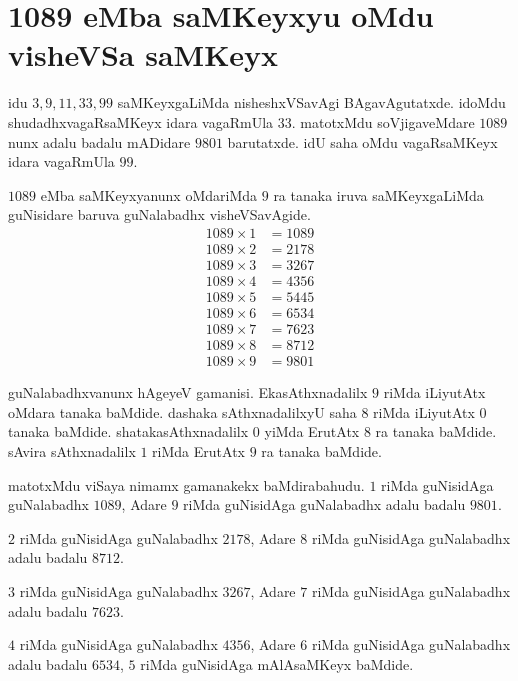 \vspace{-.5cm}
\section*{{\rm 1089} eMba saMKeyxyu oMdu visheVSa saMKeyx}

idu $3,9,11,33,99$ saMKeyxgaLiMda nisheshxVSavAgi BAgavAgutatxde. idoMdu shudadhx\-vagaRsaMKeyx idara vagaRmUla $33$. matotxMdu soVjigaveMdare $1089$ nunx adalu badalu mADidare $9801$ barutatxde. idU saha oMdu vagaRsaMKeyx idara vagaRmUla $99$.

$1089$ eMba saMKeyxyanunx oMdariMda $9$ ra tanaka iruva saMKeyxgaLiMda guNisidare baruva guNalabadhx visheVSavAgide.
\begin{align*}
1089\times 1 &= 1089\\
1089\times 2 &= 2178\\ 
1089\times 3 &= 3267\\
1089\times 4 &= 4356\\
1089\times 5 &= 5445\\
1089\times 6 &= 6534\\
1089\times 7 &= 7623\\
1089\times 8 &= 8712\\
1089\times 9 &= 9801
\end{align*}

guNalabadhxvanunx hAgeyeV gamanisi. EkasAthxnadalilx $9$ riMda iLiyutAtx oMdara tanaka baMdide. dashaka sAthxnadalilxyU saha $8$ riMda iLiyutAtx $0$ tanaka baMdide. shataka\-sAthxnadalilx $0$ yiMda ErutAtx $8$ ra tanaka baMdide. sAvira sAthxnadalilx $1$ riMda ErutAtx $9$ ra tanaka baMdide.

matotxMdu viSaya nimamx gamanakekx baMdirabahudu. $1$ riMda guNisidAga guNalabadhx $1089$, Adare $9$ riMda guNisidAga guNalabadhx adalu badalu $9801$.

$2$ riMda guNisidAga guNalabadhx $2178$, Adare $8$ riMda guNisidAga guNalabadhx adalu badalu $8712$.

$3$ riMda guNisidAga guNalabadhx $3267$, Adare $7$ riMda guNisidAga guNalabadhx adalu badalu $7623$.

$4$ riMda guNisidAga guNalabadhx $4356$, Adare $6$ riMda guNisidAga guNalabadhx adalu badalu $6534$, $5$ riMda guNisidAga mAlAsaMKeyx baMdide.






